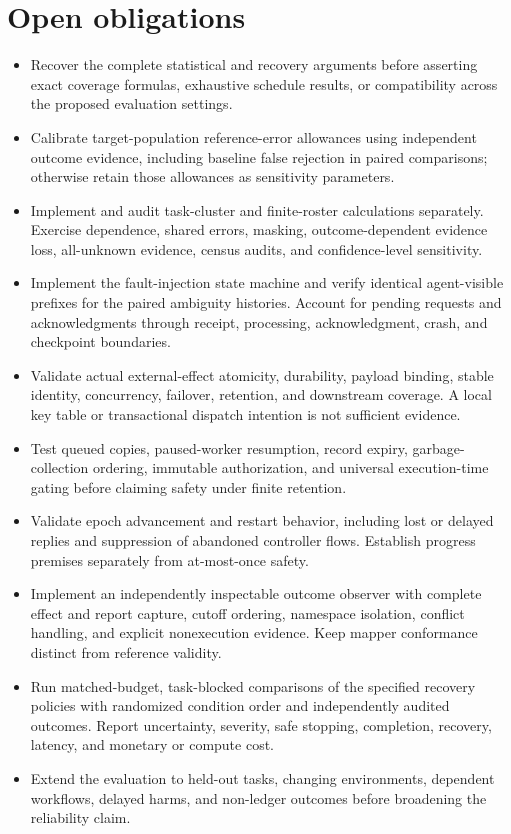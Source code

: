 \documentclass[11pt]{article}
\begin{document}
\section{Open obligations}
\begin{itemize}
\item Recover the complete statistical and recovery arguments before asserting exact coverage formulas, exhaustive schedule results, or compatibility across the proposed evaluation settings.
\item Calibrate target-population reference-error allowances using independent outcome evidence, including baseline false rejection in paired comparisons; otherwise retain those allowances as sensitivity parameters.
\item Implement and audit task-cluster and finite-roster calculations separately. Exercise dependence, shared errors, masking, outcome-dependent evidence loss, all-unknown evidence, census audits, and confidence-level sensitivity.
\item Implement the fault-injection state machine and verify identical agent-visible prefixes for the paired ambiguity histories. Account for pending requests and acknowledgments through receipt, processing, acknowledgment, crash, and checkpoint boundaries.
\item Validate actual external-effect atomicity, durability, payload binding, stable identity, concurrency, failover, retention, and downstream coverage. A local key table or transactional dispatch intention is not sufficient evidence.
\item Test queued copies, paused-worker resumption, record expiry, garbage-collection ordering, immutable authorization, and universal execution-time gating before claiming safety under finite retention.
\item Validate epoch advancement and restart behavior, including lost or delayed replies and suppression of abandoned controller flows. Establish progress premises separately from at-most-once safety.
\item Implement an independently inspectable outcome observer with complete effect and report capture, cutoff ordering, namespace isolation, conflict handling, and explicit nonexecution evidence. Keep mapper conformance distinct from reference validity.
\item Run matched-budget, task-blocked comparisons of the specified recovery policies with randomized condition order and independently audited outcomes. Report uncertainty, severity, safe stopping, completion, recovery, latency, and monetary or compute cost.
\item Extend the evaluation to held-out tasks, changing environments, dependent workflows, delayed harms, and non-ledger outcomes before broadening the reliability claim.
\end{itemize}
\end{document}
